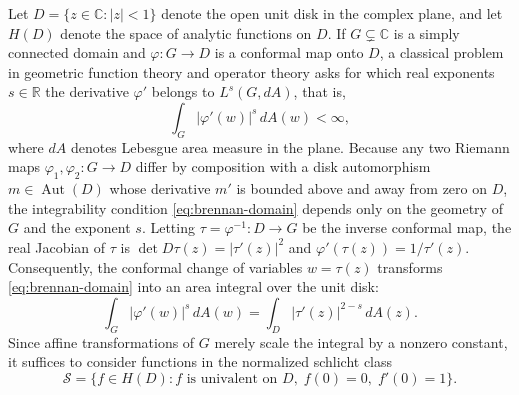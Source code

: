 \documentclass[12pt]{article}
\def\R{\mathbb{R}}
\def\C{\mathbb{C}}
\def\S{\mathcal{S}}
\theoremstyle{definition}
\numberwithin{equation}{section}
\begin{document}
Let $D = \{z \in \C : |z| < 1\}$ denote the open unit disk in the complex plane, and let $H(D)$ denote the space of analytic functions on $D$. If $G \subsetneq \C$ is a simply connected domain and $\varphi : G \to D$ is a conformal map onto $D$, a classical problem in geometric function theory and operator theory asks for which real exponents $s \in \R$ the derivative $\varphi'$ belongs to $L^s(G, dA)$, that is,
\begin{equation}\label{eq:brennan-domain}
  \int_G |\varphi'(w)|^s \, dA(w) < \infty,
\end{equation}
where $dA$ denotes Lebesgue area measure in the plane. Because any two Riemann maps $\varphi_1, \varphi_2 : G \to D$ differ by composition with a disk automorphism $m \in \operatorname{Aut}(D)$ whose derivative $m'$ is bounded above and away from zero on $D$, the integrability condition \eqref{eq:brennan-domain} depends only on the geometry of $G$ and the exponent $s$. Letting $\tau = \varphi^{-1} : D \to G$ be the inverse conformal map, the real Jacobian of $\tau$ is $\det D\tau(z) = |\tau'(z)|^2$ and $\varphi'(\tau(z)) = 1/\tau'(z)$. Consequently, the conformal change of variables $w = \tau(z)$ transforms \eqref{eq:brennan-domain} into an area integral over the unit disk:
\begin{equation}\label{eq:brennan-disk}
  \int_G |\varphi'(w)|^s \, dA(w) = \int_D |\tau'(z)|^{2-s} \, dA(z).
\end{equation}
Since affine transformations of $G$ merely scale the integral by a nonzero constant, it suffices to consider functions in the normalized schlicht class
\[
  \S = \{f \in H(D) : f \text{ is univalent on } D,\; f(0) = 0,\; f'(0) = 1\}.
\]
\end{document}
